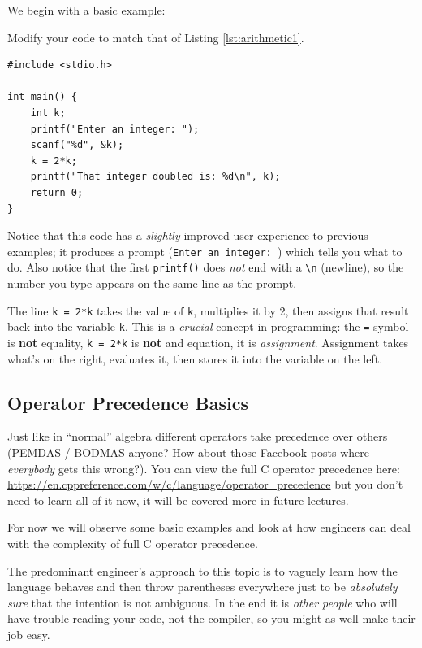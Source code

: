 \documentclass{lab}
\begin{document}
We begin with a basic example:

Modify your code to match that of Listing \ref{lst:arithmetic1}.

\begin{lstlisting}[style=CStyle,caption=A basic arithmetic example,label=lst:arithmetic1]
#include <stdio.h>

int main() {
	int k;
	printf("Enter an integer: ");
	scanf("%d", &k);
	k = 2*k;
	printf("That integer doubled is: %d\n", k);
	return 0;
}
\end{lstlisting}

Notice that this code has a \textit{slightly} improved user experience to previous examples; it produces a prompt (\texttt{Enter an integer: }) which tells you what to do. Also notice that the first \texttt{printf()} does \textit{not} end with a \texttt{\textbackslash n} (newline), so the number you type appears on the same line as the prompt.

The line \texttt{k = 2*k} takes the value of \texttt{k}, multiplies it by 2, then assigns that result back into the variable \texttt{k}. This is a \textit{crucial} concept in programming: the \texttt{=} symbol is \textbf{not} equality, \texttt{k = 2*k} is \textbf{not} and equation, it is \textit{assignment}. Assignment takes what's on the right, evaluates it, then stores it into the variable on the left.

\subsection{Operator Precedence Basics}

Just like in ``normal'' algebra different operators take precedence over others (PEMDAS / BODMAS anyone? How about those Facebook posts where \textit{everybody} gets this wrong?). You can view the full C operator precedence here: \url{https://en.cppreference.com/w/c/language/operator_precedence} but you don't need to learn all of it now, it will be covered more in future lectures.

For now we will observe some basic examples and look at how engineers can deal with the complexity of full C operator precedence.

The predominant engineer's approach to this topic is to vaguely learn how the language behaves and then throw parentheses everywhere just to be \textit{absolutely sure} that the intention is not ambiguous. In the end it is \textit{other people} who will have trouble reading your code, not the compiler, so you might as well make their job easy.
\end{document}
